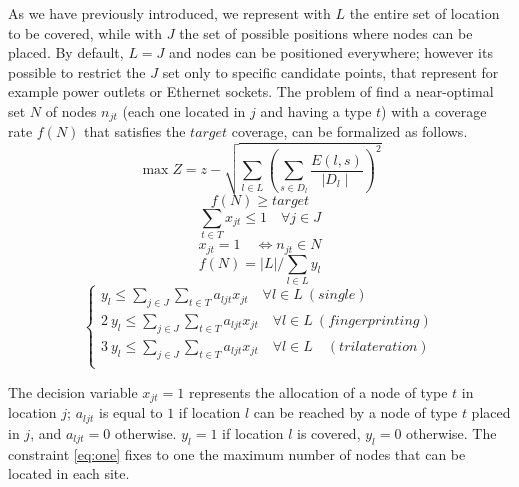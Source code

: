 As we have previously introduced, we represent with \(L\)  the entire set of location to be covered, while with \(J\) the set of possible positions where nodes can be placed. By default, \(L = J\) and nodes can be positioned everywhere; however its possible to restrict the \(J\) set only to specific candidate points, that represent for example power outlets or Ethernet sockets.
The problem of find a near-optimal set \(N\) of nodes \(n_{jt}\) (each one located in $j$ and having a type $t$) with a coverage rate $f(N)$ that satisfies the $target$ coverage, can be formalized as follows.
\begin{equation}\label{eq:Z}
\max Z = z - \sqrt{\sum\limits_{l\in L}\left(\sum\limits_{s\in D_l}\frac{E(l,s)}{\mid D_l \mid}\right)^2}
\end{equation}
\begin{equation}\label{eq:cov}
f(N) \geq target
\end{equation}
\begin{equation}\label{eq:one}
\sum\limits_{t \in T} x_{jt} \leq 1 \quad \forall j \in J
\end{equation}
\begin{equation}\label{eq:x}
x_{jt} = 1 \quad \iff n_{jt} \in N
\end{equation}
\begin{equation}\label{eq:f}
f(N)= \lvert L \rvert / \sum\limits_{l \in L} y_l
\end{equation}
\begin{equation}\label{eq:y}
\begin{cases}
y_l \leq \sum\limits_{j \in J}\sum\limits_{t \in T} a_{ljt} x_{jt} \quad \forall l \in L ~ (single)\\
2~y_l \leq \sum\limits_{j \in J}\sum\limits_{t \in T} a_{ljt} x_{jt} \quad \forall l \in L ~ (fingerprinting)\\
3~y_l \leq \sum\limits_{j \in J}\sum\limits_{t \in T} a_{ljt} x_{jt} \quad \forall l \in L \quad (trilateration)\\
\end{cases}
\end{equation}

The decision variable $x_{jt}=1$ represents the allocation of a node of type $t$ in location $j$; $a_{ljt}$ is equal to $1$ if location $l$ can be reached by a node of type $t$ placed in $j$, and $a_{ljt}=0$ otherwise. $y_l=1$ if location $l$ is covered, $y_l=0$ otherwise. The constraint \eqref{eq:one} fixes to one the maximum number of nodes that can be located in each site.

